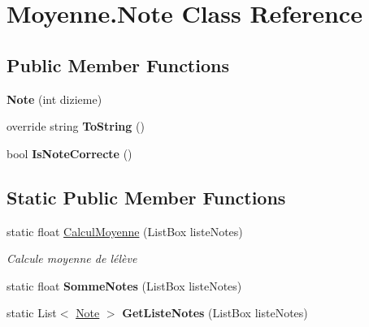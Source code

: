 \hypertarget{class_moyenne_1_1_note}{}\section{Moyenne.\+Note Class Reference}
\label{class_moyenne_1_1_note}
\subsection*{Public Member Functions}
\begin{DoxyCompactItemize}
\item 
\mbox{\label{class_moyenne_1_1_note_abf8d504fdae5f75270fc06073cd2e055}} 
{\bfseries Note} (int dizieme)
\item 
\mbox{\label{class_moyenne_1_1_note_a988f0e03904ac78184a43c67a962849d}} 
override string {\bfseries To\+String} ()
\item 
\mbox{\label{class_moyenne_1_1_note_acac42334c72a6006967b068e3ee371da}} 
bool {\bfseries Is\+Note\+Correcte} ()
\end{DoxyCompactItemize}
\subsection*{Static Public Member Functions}
\begin{DoxyCompactItemize}
\item 
static float \hyperlink{class_moyenne_1_1_note_afcbbe7434fea2a87085b201dc07289a4}{Calcul\+Moyenne} (List\+Box liste\+Notes)
\begin{DoxyCompactList}\small\item\em Calcule moyenne de l\textquotesingle{}élève \end{DoxyCompactList}\item 
\mbox{\label{class_moyenne_1_1_note_adb651595cf0c4b15c41d55228704f15a}} 
static float {\bfseries Somme\+Notes} (List\+Box liste\+Notes)
\item 
\mbox{\label{class_moyenne_1_1_note_aa8f1a8abb95aba277e4a98c29b0168c3}} 
static List$<$ \hyperlink{class_moyenne_1_1_note}{Note} $>$ {\bfseries Get\+Liste\+Notes} (List\+Box liste\+Notes)
\end{DoxyCompactItemize}
